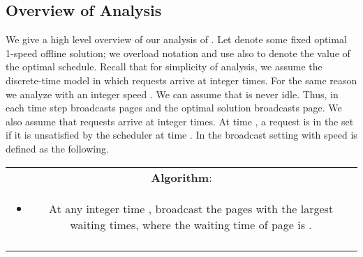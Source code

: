 \documentclass[11pt]{article}
\newcommand{\spbox}{-4mm}
\begin{document}
\begin{titlepage}
\subsection{Overview of Analysis}\vspace{-2mm}
\label{sec:overview} We give a high level overview of our analysis of
.  Let  denote some fixed optimal 1-speed offline
solution; we overload notation and use  also to denote the value
of the optimal schedule. Recall that for simplicity of analysis, we
assume the discrete-time model in which requests arrive at integer
times. For the same reason we analyze  with an integer speed . We can assume that  is never idle. Thus, in each time step
 broadcasts  pages and the optimal solution broadcasts 
page. We also assume that requests arrive at integer times.  At time
, a request is in the set  if it is unsatisfied by the
scheduler at time . In the broadcast setting  with speed 
is defined as the following. \vspace{\spbox}\vspace{-2mm}

\begin{center}
\begin{tabular}[r]{|c|}
\hline
\textbf{Algorithm}:  \\

\begin{minipage}{\textwidth}
\begin{itemize}
\item At any integer time , broadcast the  pages with the
  largest waiting times, where the waiting time of page  is
  .
\end{itemize}
\vspace{-7mm}
\end{minipage}\\\\

\hline
\end{tabular}
\end{center}\vspace{-2mm}


\end{titlepage}
\end{document}

